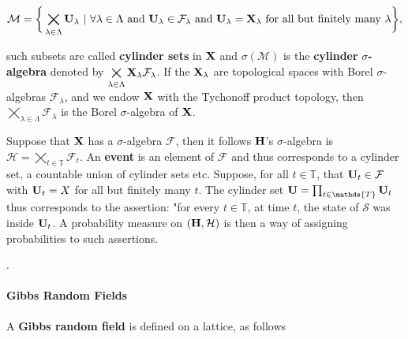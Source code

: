 \documentclass{homework}
\begin{document}
{\begin{itemize}
        $$
        \mathcal{M} = \bigg\{\bigtimes\limits_{\lambda \in \Lambda}{\bf U}_\lambda \textnormal{ } | \textnormal{ } \forall \lambda \in \Lambda \textnormal{ and } {\bf U}_{\lambda} \in \mathcal{F}_{\lambda} \textnormal{ and } {\bf U}_{\lambda} = {\bf X}_{\lambda} \textnormal{ for all but finitely many } \lambda \bigg\},
        $$
        
    such subsets are called \textbf{cylinder sets} in ${\bf X}$ and $\sigma(\mathcal{M})$ is the \textbf{cylinder} $\sigma$\textbf{-algebra} denoted by $\bigtimes\limits_{\lambda \in \Lambda}{\bf X}_\lambda \mathcal{F}_{\lambda}$. If the ${\bf X}_{\lambda}$ are topological spaces with Borel $\sigma$-algebras $\mathcal{F}_{\lambda}$, and we endow ${\bf X}$ with the Tychonoff product topology, then $\bigtimes\limits_{\lambda \in \Lambda} \mathcal{F}_{\lambda}$ is the Borel $\sigma$-algebra of ${\bf X}$. \\
    \end{itemize}
    
    Suppose that ${\bf X}$ has a $\sigma$-algebra $\mathcal{F}$, then it follows ${\bf H}$'s $\sigma$-algebra is $\mathcal{H}= \bigtimes\limits_{t \in \mathds{T}}\mathcal{F}_t$. An \textbf{event} is an element of $\mathcal{F}$ and thus corresponds to a cylinder set, a countable union of cylinder sets etc. Suppose, for all ${t\in \mathds{T}}$, that ${\bf U}_t \in \mathcal{F}$ with ${\bf U}_t = X$ for all but finitely many $t$. The cylinder set ${\bf U} = \prod_{t \in \mathds{T}} {\bf U}_t$ thus corresponds to the assertion: "for every ${t\in \mathds{T}}$, at time $t$, the state of $\mathcal{S}$ was inside ${\bf U}_t$. A probability measure on $(\bf H, \mathcal{H})$ is then a way of assigning probabilities to such assertions. }. \\
    
\paragraph{\textbf{Gibbs Random Fields}}

A \textbf{Gibbs random field} is defined on a lattice, as follows
\end{document}
